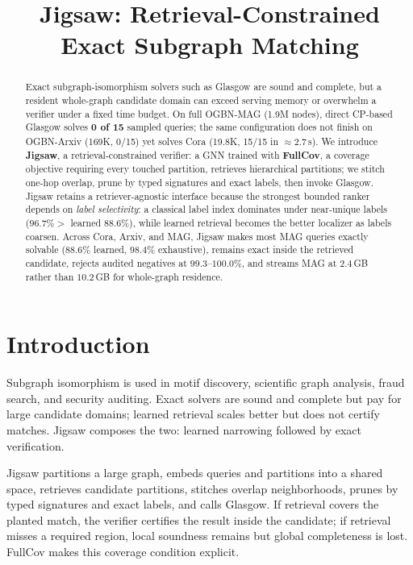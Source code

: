 \documentclass[runningheads]{llncs}
\begin{document}
\title{Jigsaw: Retrieval-Constrained Exact Subgraph Matching}
\author{}
\institute{}
\maketitle

\begin{abstract}
Exact subgraph-isomorphism solvers such as Glasgow are sound and complete, but a resident whole-graph candidate domain can exceed serving memory or overwhelm a verifier under a fixed time budget. On full OGBN-MAG (1.9M nodes), direct CP-based Glasgow solves \textbf{0 of 15} sampled queries; the same configuration does not finish on OGBN-Arxiv (169K, 0/15) yet solves Cora (19.8K, 15/15 in ${\approx}2.7$\,s). We introduce \textbf{Jigsaw}, a retrieval-constrained verifier: a GNN trained with \textbf{FullCov}, a coverage objective requiring every touched partition, retrieves hierarchical partitions; we stitch one-hop overlap, prune by typed signatures and exact labels, then invoke Glasgow. Jigsaw retains a retriever-agnostic interface because the strongest bounded ranker depends on \emph{label selectivity}: a classical label index dominates under near-unique labels ($96.7\%>$ learned $88.6\%$), while learned retrieval becomes the better localizer as labels coarsen. Across Cora, Arxiv, and MAG, Jigsaw makes most MAG queries exactly solvable ($88.6\%$ learned, $98.4\%$ exhaustive), remains exact inside the retrieved candidate, rejects audited negatives at $99.3$--$100.0\%$, and streams MAG at $2.4$\,GB rather than $10.2$\,GB for whole-graph residence.
\end{abstract}

\section{Introduction}

Subgraph isomorphism is used in motif discovery, scientific graph analysis, fraud search, and security auditing. Exact solvers are sound and complete but pay for large candidate domains; learned retrieval scales better but does not certify matches. Jigsaw composes the two: learned narrowing followed by exact verification.

Jigsaw partitions a large graph, embeds queries and partitions into a shared space, retrieves candidate partitions, stitches overlap neighborhoods, prunes by typed signatures and exact labels, and calls Glasgow. If retrieval covers the planted match, the verifier certifies the result inside the candidate; if retrieval misses a required region, local soundness remains but global completeness is lost. FullCov makes this coverage condition explicit.
\end{document}
